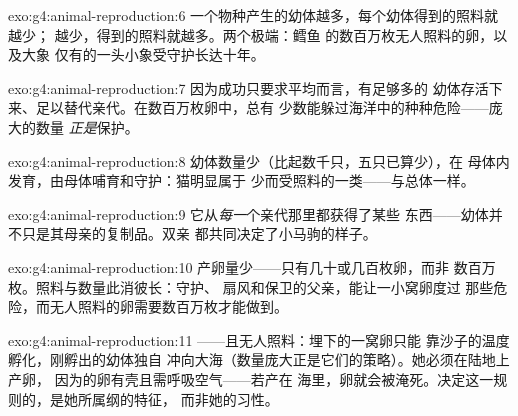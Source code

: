 \begin{solution}{exo:g4:animal-reproduction:6}
一个物种产生的幼体越多，每个幼体得到的照料就越少；
越少，得到的照料就越多。两个极端：鳕鱼
的数百万枚无人照料的卵，以及大象
仅有的一头小象受守护长达十年。
\end{solution}

\begin{solution}{exo:g4:animal-reproduction:7}
因为成功只要求平均而言，有足够多的
幼体存活下来、足以替代亲代。在数百万枚卵中，总有
少数能躲过海洋中的种种危险——庞大的数量
\emph{正是}保护。
\end{solution}

\begin{solution}{exo:g4:animal-reproduction:8}
幼体数量少（比起数千只，五只已算少），在
母体内发育，由母体哺育和守护：猫明显属于
少而受照料的一类——与总体一样。
\end{solution}

\begin{solution}{exo:g4:animal-reproduction:9}
它从\emph{每一}个亲代那里都获得了某些
东西——幼体并不只是其母亲的复制品。双亲
都共同决定了小马驹的样子。
\end{solution}

\begin{solution}{exo:g4:animal-reproduction:10}
产卵量少——只有几十或几百枚卵，而非
数百万枚。照料与数量此消彼长：守护、
扇风和保卫的父亲，能让一小窝卵度过
那些危险，而无人照料的卵需要数百万枚才能做到。
\end{solution}

\begin{solution}{exo:g4:animal-reproduction:11}
——且无人照料：埋下的一窝卵只能
靠沙子的温度孵化，刚孵出的幼体独自
冲向大海（数量庞大正是它们的策略）。她必须在陆地上产卵，
因为的卵有壳且需呼吸空气——若产在
海里，卵就会被淹死。决定这一规则的，是她所属纲的特征，
而非她的习性。
\end{solution}
